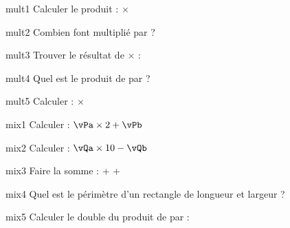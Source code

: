 \documentclass{article}
\begin{document}
\begin{question}{mult1}
  Calculer le produit : \vKa{} $\times$ \vKb{}
  \begin{reponses}\bonne{\rK}\mauvaise{\eKa}\mauvaise{\eKb}\end{reponses}
\end{question}
\begin{question}{mult2}
  Combien font \vLa{} multiplié par \vLb{} ?
  \begin{reponses}\bonne{\rL}\mauvaise{\eLa}\mauvaise{\eLb}\end{reponses}
\end{question}
\begin{question}{mult3}
  Trouver le résultat de \vMa{} $\times$ \vMb{} :
  \begin{reponses}\bonne{\rM}\mauvaise{\eMa}\mauvaise{\eMb}\end{reponses}
\end{question}
\begin{question}{mult4}
  Quel est le produit de \vNa{} par \vNb{} ?
  \begin{reponses}\bonne{\rN}\mauvaise{\eNa}\mauvaise{\eNb}\end{reponses}
\end{question}
\begin{question}{mult5}
  Calculer : \vOa{} $\times$ \vOb{}
  \begin{reponses}\bonne{\rO}\mauvaise{\eOa}\mauvaise{\eOb}\end{reponses}
\end{question}

\begin{question}{mix1}
  Calculer : $\vPa \times 2 + \vPb$
  \begin{reponses}\bonne{\rP}\mauvaise{\ePa}\mauvaise{\ePb}\end{reponses}
\end{question}
\begin{question}{mix2}
  Calculer : $\vQa \times 10 - \vQb$
  \begin{reponses}\bonne{\rQ}\mauvaise{\eQa}\mauvaise{\eQb}\end{reponses}
\end{question}
\begin{question}{mix3}
  Faire la somme : \vRa{} + \vRb{} + \vRc{}
  \begin{reponses}\bonne{\rR}\mauvaise{\eRa}\mauvaise{\eRb}\end{reponses}
\end{question}
\begin{question}{mix4}
  Quel est le périmètre d'un rectangle de longueur \vSa{} et largeur \vSb{} ?
  \begin{reponses}\bonne{\rS}\mauvaise{\eSa}\mauvaise{\eSb}\end{reponses}
\end{question}
\begin{question}{mix5}
  Calculer le double du produit de \vTa{} par \vTb{} :
  \begin{reponses}\bonne{\rT}\mauvaise{\eTa}\mauvaise{\eTb}\end{reponses}
\end{question}
\end{document}
